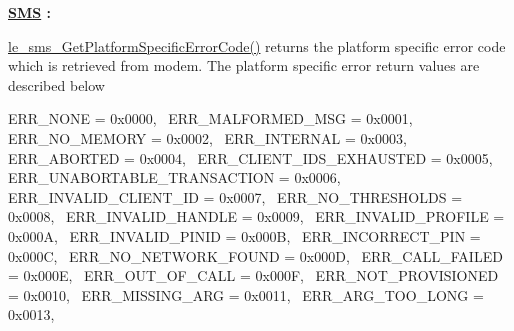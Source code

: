 {\bfseries \hyperlink{c_sms}{S\+MS} \+:}
\begin{DoxyItemize}
\item \hyperlink{le__sms__interface_8h_a9cfbc2131df38f99272a71bf05cb1254}{le\+\_\+sms\+\_\+\+Get\+Platform\+Specific\+Error\+Code()} returns the platform specific error code which is retrieved from modem. The platform specific error return values are described below

E\+R\+R\+\_\+\+N\+O\+NE = 0x0000,~\newline
 E\+R\+R\+\_\+\+M\+A\+L\+F\+O\+R\+M\+E\+D\+\_\+\+M\+SG = 0x0001,~\newline
 E\+R\+R\+\_\+\+N\+O\+\_\+\+M\+E\+M\+O\+RY = 0x0002,~\newline
 E\+R\+R\+\_\+\+I\+N\+T\+E\+R\+N\+AL = 0x0003,~\newline
 E\+R\+R\+\_\+\+A\+B\+O\+R\+T\+ED = 0x0004,~\newline
 E\+R\+R\+\_\+\+C\+L\+I\+E\+N\+T\+\_\+\+I\+D\+S\+\_\+\+E\+X\+H\+A\+U\+S\+T\+ED = 0x0005,~\newline
 E\+R\+R\+\_\+\+U\+N\+A\+B\+O\+R\+T\+A\+B\+L\+E\+\_\+\+T\+R\+A\+N\+S\+A\+C\+T\+I\+ON = 0x0006,~\newline
 E\+R\+R\+\_\+\+I\+N\+V\+A\+L\+I\+D\+\_\+\+C\+L\+I\+E\+N\+T\+\_\+\+ID = 0x0007,~\newline
 E\+R\+R\+\_\+\+N\+O\+\_\+\+T\+H\+R\+E\+S\+H\+O\+L\+DS = 0x0008,~\newline
 E\+R\+R\+\_\+\+I\+N\+V\+A\+L\+I\+D\+\_\+\+H\+A\+N\+D\+LE = 0x0009,~\newline
 E\+R\+R\+\_\+\+I\+N\+V\+A\+L\+I\+D\+\_\+\+P\+R\+O\+F\+I\+LE = 0x000A,~\newline
 E\+R\+R\+\_\+\+I\+N\+V\+A\+L\+I\+D\+\_\+\+P\+I\+N\+ID = 0x000B,~\newline
 E\+R\+R\+\_\+\+I\+N\+C\+O\+R\+R\+E\+C\+T\+\_\+\+P\+IN = 0x000C,~\newline
 E\+R\+R\+\_\+\+N\+O\+\_\+\+N\+E\+T\+W\+O\+R\+K\+\_\+\+F\+O\+U\+ND = 0x000D,~\newline
 E\+R\+R\+\_\+\+C\+A\+L\+L\+\_\+\+F\+A\+I\+L\+ED = 0x000E,~\newline
 E\+R\+R\+\_\+\+O\+U\+T\+\_\+\+O\+F\+\_\+\+C\+A\+LL = 0x000F,~\newline
 E\+R\+R\+\_\+\+N\+O\+T\+\_\+\+P\+R\+O\+V\+I\+S\+I\+O\+N\+ED = 0x0010,~\newline
 E\+R\+R\+\_\+\+M\+I\+S\+S\+I\+N\+G\+\_\+\+A\+RG = 0x0011,~\newline
 E\+R\+R\+\_\+\+A\+R\+G\+\_\+\+T\+O\+O\+\_\+\+L\+O\+NG = 0x0013,~\newline

\end{DoxyItemize}
